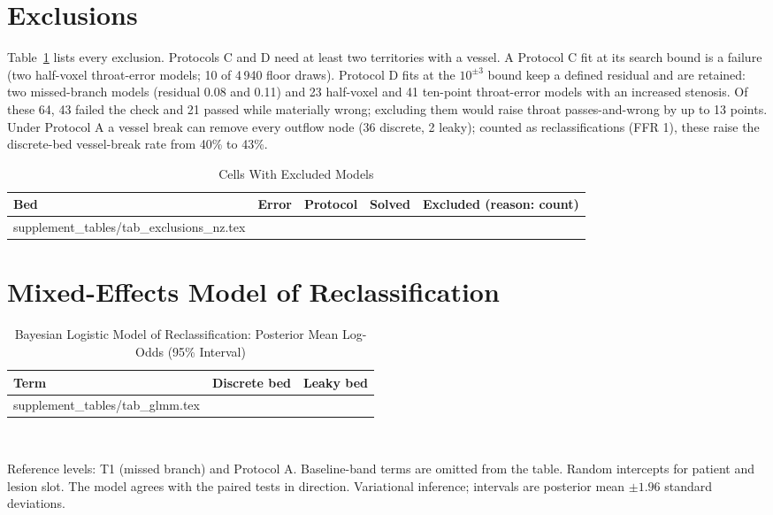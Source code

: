 \documentclass[journal,twoside,web,onecolumn]{ieeecolor}
\begin{document}
\FloatBarrier
{}
\section{Exclusions}\label{sec:excl}
Table~\ref{tab:excl} lists every exclusion. Protocols C and D need at least two territories with a vessel. A Protocol C fit at its search bound is a failure (two half-voxel throat-error models; 10 of 4\,940 floor draws). Protocol D fits at the $10^{\pm 3}$ bound keep a defined residual and are retained: two missed-branch models (residual 0.08 and 0.11) and 23 half-voxel and 41 ten-point throat-error models with an increased stenosis. Of these 64, 43 failed the check and 21 passed while materially wrong; excluding them would raise throat passes-and-wrong by up to 13 points. Under Protocol A a vessel break can remove every outflow node (36 discrete, 2 leaky); counted as reclassifications (FFR 1), these raise the discrete-bed vessel-break rate from 40\% to 43\%.
\begin{table}[!ht]
\caption{Cells With Excluded Models}\label{tab:excl}
\centering\footnotesize
\begin{tabular}{@{}lllrl@{}}
\toprule
Bed & Error & Protocol & Solved & Excluded (reason: count)\\
\midrule
{} supplement_tables/tab_exclusions_nz.tex 
\bottomrule
\end{tabular}
\end{table}

\FloatBarrier
{}
\section{Mixed-Effects Model of Reclassification}
\begin{table}[!ht]
\caption{Bayesian Logistic Model of Reclassification: Posterior Mean Log-Odds (95\% Interval)}\label{tab:glmm}
\centering\footnotesize
\begin{tabular}{@{}lcc@{}}
\toprule
Term & Discrete bed & Leaky bed\\
\midrule
{} supplement_tables/tab_glmm.tex 
\bottomrule
\end{tabular}
\\[3pt]
\parbox{0.85\textwidth}{\footnotesize Reference levels: T1 (missed branch) and Protocol A. Baseline-band terms are
omitted from the table. Random intercepts for patient and lesion slot. The model agrees with the paired tests in direction. Variational inference; intervals are posterior mean $\pm 1.96$ standard deviations.}
\end{table}
\end{document}
